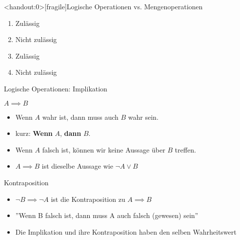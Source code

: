 {
\begin{frame}<handout:0>[fragile]{Logische Operationen vs. Mengenoperationen}
	\begin{enumerate}[<+- | alert@+>]
		\item Zulässig
		\item Nicht zulässig
		\item Zulässig
		\item Nicht zulässig
	\end{enumerate}
\end{frame}
}

\begin{frame}{Logische Operationen: Implikation}
	\begin{alertblock}{$A\implies B$}
		\begin{itemize}
			\item \glqq Wenn $A$ wahr ist, dann muss auch $B$ wahr sein.\grqq
			\item kurz: \glqq\textbf{Wenn} $A$, \textbf{dann} $B$.\grqq
			\item Wenn $A$ falsch ist, können wir keine Aussage über $B$ treffen.
			\item $A\implies B$ ist dieselbe Aussage wie $\neg A \vee B$
		\end{itemize}
	\end{alertblock}
	 {
		\begin{exampleblock}{Kontraposition}
			\begin{itemize}
				\item $\lnot B\implies \lnot A$ ist die Kontraposition zu $A \implies B$
				\item ''Wenn B falsch ist, dann muss A auch falsch (gewesen) sein''
				\item Die Implikation und ihre Kontraposition haben den selben Wahrheitswert
			\end{itemize}
		\end{exampleblock}
	}
\end{frame}

